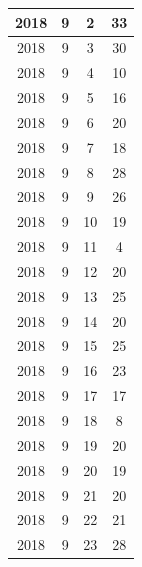 \begin{longtable} {|c|c|c|c|}
\hline
2018         & 9            & 2            & 33                        \\ 
\hline
2018         & 9            & 3            & 30                        \\ 
\hline
2018         & 9            & 4            & 10                        \\ 
\hline
2018         & 9            & 5            & 16                        \\ 
\hline
2018         & 9            & 6            & 20                        \\ 
\hline
2018         & 9            & 7            & 18                        \\ 
\hline
2018         & 9            & 8            & 28                        \\ 
\hline
2018         & 9            & 9            & 26                        \\ 
\hline
2018         & 9            & 10           & 19                        \\ 
\hline
2018         & 9            & 11           & 4                         \\ 
\hline
2018         & 9            & 12           & 20                        \\ 
\hline
2018         & 9            & 13           & 25                        \\ 
\hline
2018         & 9            & 14           & 20                        \\ 
\hline
2018         & 9            & 15           & 25                        \\ 
\hline
2018         & 9            & 16           & 23                        \\ 
\hline
2018         & 9            & 17           & 17                        \\ 
\hline
2018         & 9            & 18           & 8                         \\ 
\hline
2018         & 9            & 19           & 20                        \\ 
\hline
2018         & 9            & 20           & 19                        \\ 
\hline
2018         & 9            & 21           & 20                        \\ 
\hline
2018         & 9            & 22           & 21                        \\ 
\hline
2018         & 9            & 23           & 28                        \\ 

\end{longtable}
